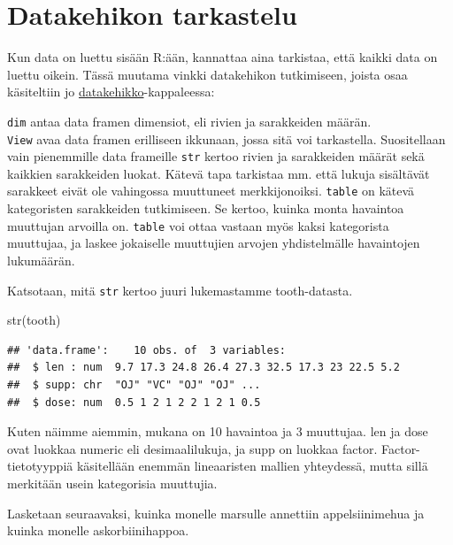 \documentclass[
]{book}
\newenvironment{Shaded}{\begin{snugshade}}{\end{snugshade}}
\newcommand{\FunctionTok}[1]{\textcolor[rgb]{0.00,0.00,0.00}{#1}}
\newcommand{\NormalTok}[1]{#1}
\newcommand{\SpecialCharTok}[1]{\textcolor[rgb]{0.00,0.00,0.00}{#1}}
\begin{document}
\hypertarget{datakehikon-tarkastelu}{%
\section{Datakehikon tarkastelu}\label{datakehikon-tarkastelu}}

Kun data on luettu sisään R:ään, kannattaa aina tarkistaa, että kaikki data on luettu oikein. Tässä muutama vinkki datakehikon tutkimiseen, joista osaa käsiteltiin jo \protect\hyperlink{data-frame}{datakehikko}-kappaleessa:

\texttt{dim} antaa data framen dimensiot, eli rivien ja sarakkeiden määrän.\\
\texttt{View} avaa data framen erilliseen ikkunaan, jossa sitä voi tarkastella. Suositellaan vain pienemmille data frameille
\texttt{str} kertoo rivien ja sarakkeiden määrät sekä kaikkien sarakkeiden luokat. Kätevä tapa tarkistaa mm. että lukuja sisältävät sarakkeet eivät ole vahingossa muuttuneet merkkijonoiksi.
\texttt{table} on kätevä kategoristen sarakkeiden tutkimiseen. Se kertoo, kuinka monta havaintoa muuttujan arvoilla on. \texttt{table} voi ottaa vastaan myös kaksi kategorista muuttujaa, ja laskee jokaiselle muuttujien arvojen yhdistelmälle havaintojen lukumäärän.

Katsotaan, mitä \texttt{str} kertoo juuri lukemastamme tooth-datasta.

\begin{Shaded}
\begin{Highlighting}[]
\FunctionTok{str}\NormalTok{(tooth)}
\end{Highlighting}
\end{Shaded}

\begin{verbatim}
## 'data.frame':    10 obs. of  3 variables:
##  $ len : num  9.7 17.3 24.8 26.4 27.3 32.5 17.3 23 22.5 5.2
##  $ supp: chr  "OJ" "VC" "OJ" "OJ" ...
##  $ dose: num  0.5 1 2 1 2 2 1 2 1 0.5
\end{verbatim}

Kuten näimme aiemmin, mukana on 10 havaintoa ja 3 muuttujaa. len ja dose ovat luokkaa numeric eli desimaalilukuja, ja supp on luokkaa factor. Factor-tietotyyppiä käsitellään enemmän lineaaristen mallien yhteydessä, mutta sillä merkitään usein kategorisia muuttujia.

Lasketaan seuraavaksi, kuinka monelle marsulle annettiin appelsiinimehua ja kuinka monelle askorbiinihappoa.

\begin{Shaded}
\end{Shaded}
\end{document}
